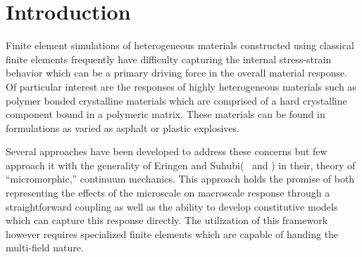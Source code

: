 \section{Introduction}

Finite element simulations of heterogeneous materials constructed using classical finite elements frequently have difficulty capturing the internal stress-strain behavior which can be a primary driving force in the overall material response. Of particular interest are the responses of highly heterogeneous materials such as polymer bonded crystalline materials which are comprised of a hard crystalline component bound in a polymeric matrix. These materials can be found in formulations as varied as asphalt or plastic explosives.

Several approaches have been developed to address these concerns but few approach it with the generality of Eringen and Suhubi(~\cite{bib:eringen64} and \cite{bib:eringen64_2}) in their, theory of ``micromorphic,'' continuum mechanics. This approach holds the promise of both representing the effects of the microscale on macroscale response through a straightforward coupling as well as the ability to develop constitutive models which can capture this response directly. The utilization of this framework however requires specialized finite elements which are capable of handing the multi-field nature.